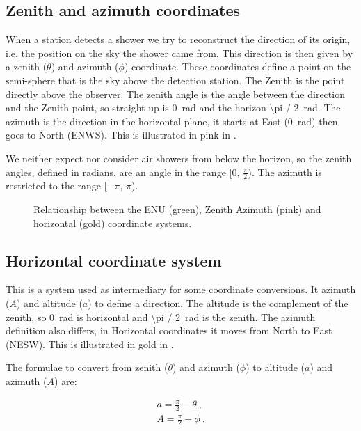 \subsection{Zenith and azimuth coordinates}

When a station detects a shower we try to reconstruct the direction of
its origin, i.e. the position on the sky the shower came from. This
direction is then given by a zenith ($\theta$) and azimuth ($\phi$)
coordinate. These coordinates define a point on the semi-sphere that is
the sky above the detection station. The Zenith is the point directly
above the observer. The zenith angle is the angle between the direction
and the Zenith point, so straight up is \SI{0}{\radian} and the horizon
\SI{\pi / 2}{\radian}. The azimuth is the direction in the horizontal
plane, it starts at East (\SI{0}{\radian}) then goes to North (ENWS).
This is illustrated in pink in .

We neither expect nor consider air showers from below the horizon, so the
zenith angles, defined in radians, are an angle in the range [0,
$\frac{\pi}{2}$). The azimuth is restricted to the range [$-\pi$, $\pi$).

\begin{figure}
    \centering
    
    \caption{Relationship between the ENU (green), Zenith Azimuth (pink)
             and horizontal (gold) coordinate systems.}
    \label{fig:enu_horizontal}
\end{figure}


\subsection{Horizontal coordinate system}

This is a system used as intermediary for some coordinate conversions.
It azimuth ($A$) and altitude ($a$) to define a direction. The
altitude is the complement of the zenith, so \SI{0}{\radian} is horizontal
and \SI{\pi / 2}{\radian} is the zenith. The azimuth definition also
differs, in Horizontal coordinates it moves from North to East (NESW).
This is illustrated in gold in .

The formulae to convert from zenith ($\theta$) and azimuth ($\phi$) to
altitude ($a$) and azimuth ($A$) are:

\begin{equation}
    \begin{array}{l}
        a = \frac{\pi}{2} - \theta \ , \\
        A = \frac{\pi}{2} - \phi \ .
    \end{array}
\end{equation}


